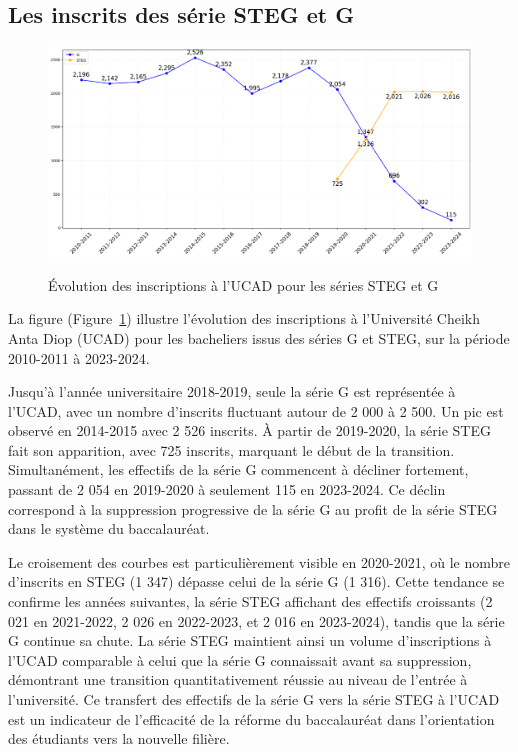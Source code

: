 \subsection{Les inscrits des série STEG et G}

\begin{figure}[ht]
\centering
\caption{Évolution des inscriptions à l'UCAD pour les séries STEG et G}
\includegraphics[width=1\textwidth]{figure/Inscrits_ucad_STEG.png}
\label{fig:inscrits_ucad_steg}
\end{figure}

La figure (Figure~\ref{fig:inscrits_ucad_steg}) illustre l'évolution des inscriptions à l'Université Cheikh Anta Diop (UCAD) pour les bacheliers issus des séries G et STEG, sur la période 2010-2011 à 2023-2024.

Jusqu'à l'année universitaire 2018-2019, seule la série G est représentée à l'UCAD, avec un nombre d'inscrits fluctuant autour de 2 000 à 2 500. Un pic est observé en 2014-2015 avec 2 526 inscrits. 
À partir de 2019-2020, la série STEG fait son apparition, avec 725 inscrits, marquant le début de la transition. Simultanément, les effectifs de la série G commencent à décliner fortement, passant de 2 054 en 2019-2020 à seulement 115 en 2023-2024. 
Ce déclin correspond à la suppression progressive de la série G au profit de la série STEG dans le système du baccalauréat.

Le croisement des courbes est particulièrement visible en 2020-2021, où le nombre d'inscrits en STEG (1 347) dépasse celui de la série G (1 316). 
Cette tendance se confirme les années suivantes, la série STEG affichant des effectifs croissants (2 021 en 2021-2022, 2 026 en 2022-2023, et 2 016 en 2023-2024), tandis que la série G continue sa chute. 
La série STEG maintient ainsi un volume d'inscriptions à l'UCAD comparable à celui que la série G connaissait avant sa suppression, démontrant une transition quantitativement réussie au niveau de l'entrée à l'université. 
Ce transfert des effectifs de la série G vers la série STEG à l'UCAD est un indicateur de l'efficacité de la réforme du baccalauréat dans l'orientation des étudiants vers la nouvelle filière.

